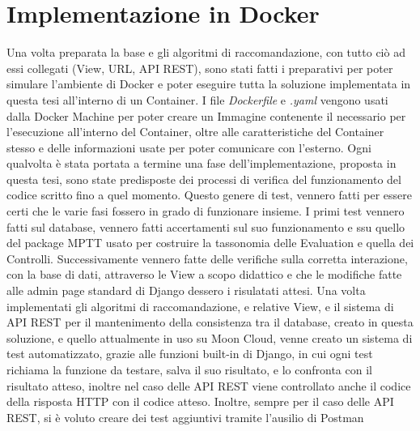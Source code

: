\section*{Implementazione in Docker}
Una volta preparata la base e gli algoritmi di raccomandazione, con tutto ciò ad essi collegati (View, URL, API REST), sono stati fatti i 
preparativi per poter simulare l'ambiente di Docker e poter eseguire tutta la soluzione implementata in questa tesi all'interno di un 
Container.\hfill\break
I file \textit{Dockerfile} e \textit{.yaml} vengono usati dalla Docker Machine per poter creare un Immagine contenente il necessario per l'esecuzione 
all'interno del Container, oltre alle caratteristiche del Container stesso e delle informazioni usate per poter comunicare con l'esterno. 
%
\vspace{1.5 cm}
\hfill\break
Ogni qualvolta è stata portata a termine una fase dell'implementazione, proposta in questa tesi, sono state predisposte 
dei processi di verifica del funzionamento del codice scritto fino a quel momento. Questo genere di test, vennero fatti 
per essere certi che le varie fasi fossero in grado di funzionare insieme.\hfill\break
I primi test vennero fatti sul database, vennero fatti accertamenti sul suo funzionamento e ssu quello del package MPTT usato 
per costruire la tassonomia delle Evaluation e quella dei Controlli. Successivamente vennero fatte delle verifiche sulla 
corretta interazione, con la base di dati, attraverso le View a scopo didattico e che le modifiche fatte alle admin page 
standard di Django dessero i risulatati attesi. Una volta implementati gli algoritmi di raccomandazione, e relative View, 
e il sistema di API REST per il mantenimento della consistenza tra il database, creato in questa soluzione, e quello 
attualmente in uso su Moon Cloud, venne creato un sistema di test automatizzato, grazie alle funzioni built-in di Django, 
in cui ogni test richiama la funzione da testare, salva il suo risultato, e lo confronta con il risultato atteso, inoltre 
nel caso delle API REST viene controllato anche il codice della risposta HTTP con il codice atteso. Inoltre, sempre per 
il caso delle API REST, si è voluto creare dei test aggiuntivi tramite l'ausilio di Postman %
